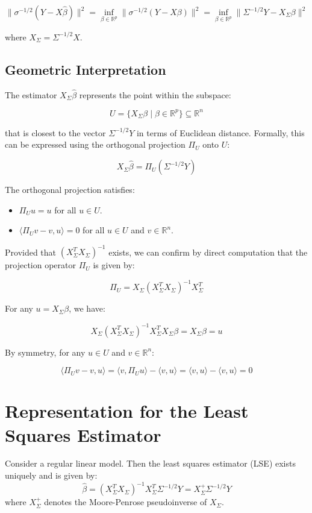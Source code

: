 \documentclass[open=any, 11pt,paper=A4]{scrreprt}
\begin{document}
\[
\|\sigma^{-1/2}(Y - X\hat{\beta})\|^2 = \inf_{\beta \in \mathbb{R}^p} \|\sigma^{-1/2}(Y - X\beta)\|^2 = \inf_{\beta \in \mathbb{R}^p} \|\Sigma^{-1/2}Y - X_\Sigma \beta\|^2
\]

where \( X_\Sigma = \Sigma^{-1/2} X \).

\subsection{Geometric Interpretation}

The estimator \( X_\Sigma \hat{\beta} \) represents the point within the subspace:

\[
U = \{ X_\Sigma \beta \mid \beta \in \mathbb{R}^p \} \subseteq \mathbb{R}^n
\]

that is closest to the vector \( \Sigma^{-1/2} Y \) in terms of Euclidean distance. Formally, this can be expressed using the orthogonal projection \( \Pi_U \) onto \( U \):

\[
X_\Sigma \hat{\beta} = \Pi_U(\Sigma^{-1/2} Y)
\]

The orthogonal projection satisfies:
\begin{itemize}
    \item \( \Pi_U u = u \) for all \( u \in U \).
    \item \( \langle \Pi_U v - v, u \rangle = 0 \) for all \( u \in U \) and \( v \in \mathbb{R}^n \).
\end{itemize}

Provided that \( (X_\Sigma^T X_\Sigma)^{-1} \) exists, we can confirm by direct computation that the projection operator \( \Pi_U \) is given by:

\[
\Pi_U = X_\Sigma (X_\Sigma^T X_\Sigma)^{-1} X_\Sigma^T
\]

For any \( u = X_\Sigma \beta \), we have:

\[
X_\Sigma (X_\Sigma^T X_\Sigma)^{-1} X_\Sigma^T X_\Sigma \beta = X_\Sigma \beta = u
\]

By symmetry, for any \( u \in U \) and \( v \in \mathbb{R}^n \):

\[
\langle \Pi_U v - v, u \rangle = \langle v, \Pi_U u \rangle - \langle v, u \rangle = \langle v, u \rangle - \langle v, u \rangle = 0
\]

\section{Representation for the Least Squares Estimator}

\begin{lemma}
    Consider a regular linear model. Then the least squares estimator (LSE) exists uniquely and is given by:
    \[
    \hat{\beta} = (X_\Sigma^T X_\Sigma)^{-1} X_\Sigma^T \Sigma^{-1/2} Y = X_\Sigma^+ \Sigma^{-1/2} Y
    \]
    where \( X_\Sigma^+ \) denotes the Moore-Penrose pseudoinverse of \( X_\Sigma \).
\end{lemma}
\end{document}

